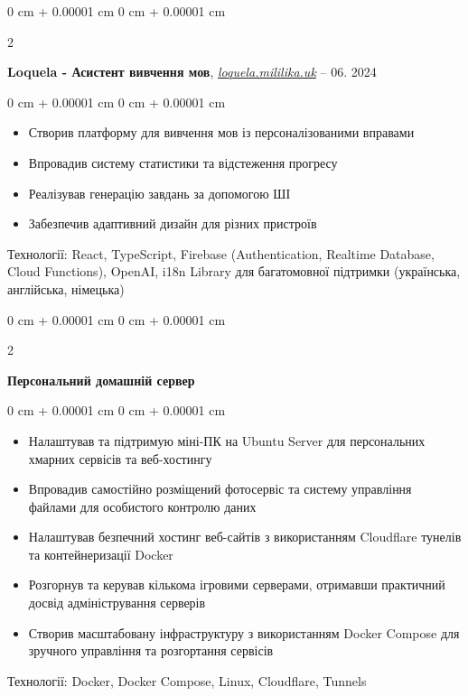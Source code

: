 \documentclass[10pt, letterpaper]{article}
\newenvironment{highlights}{
    \begin{itemize}[
        topsep=0.10 cm,
        parsep=0.10 cm,
        partopsep=0pt,
        itemsep=0pt,
        leftmargin=0 cm + 10pt
    ]
}{
    \end{itemize}
} %
\newenvironment{onecolentry}{
    \begin{adjustwidth}{
        0 cm + 0.00001 cm
    }{
        0 cm + 0.00001 cm
    }
}{
    \end{adjustwidth}
} %
\newenvironment{twocolentry}[2][]{
    \onecolentry
    \def\secondColumn{#2}
    \setcolumnwidth{\fill, 4.5 cm}
    \begin{paracol}{2}
}{
    \switchcolumn \raggedleft \secondColumn
    \end{paracol}
    \endonecolentry
} %
\let\hrefWithoutArrow\href
\begin{document}
    \begin{twocolentry}{
        04.2024 – 06. 2024
    }
        \textbf{Loquela - Асистент вивчення мов}, \hrefWithoutArrow{https://loquela.mililika.uk}{\textit{loquela.mililika.uk}} \end{twocolentry}
    \vspace{0.20 cm}
    \begin{onecolentry}
        \begin{highlights}
            \item Створив платформу для вивчення мов із персоналізованими вправами
            \item Впровадив систему статистики та відстеження прогресу
            \item Реалізував генерацію завдань за допомогою ШІ
            \item Забезпечив адаптивний дизайн для різних пристроїв
        \end{highlights}
    \end{onecolentry}
    \vspace{0.2 cm}
    Технології: React, TypeScript, Firebase (Authentication, Realtime Database, Cloud Functions), OpenAI, i18n Library для багатомовної підтримки (українська, англійська, німецька)

    \vspace{0.7 cm}

    \begin{twocolentry}{}
        \textbf{Персональний домашній сервер} \end{twocolentry}
    \vspace{0.20 cm}
    \begin{onecolentry}
        \begin{highlights}
            \item Налаштував та підтримую міні-ПК на Ubuntu Server для персональних хмарних сервісів та веб-хостингу
            \item Впровадив самостійно розміщений фотосервіс та систему управління файлами для особистого контролю даних
            \item Налаштував безпечний хостинг веб-сайтів з використанням Cloudflare тунелів та контейнеризації Docker
            \item Розгорнув та керував кількома ігровими серверами, отримавши практичний досвід адміністрування серверів
            \item Створив масштабовану інфраструктуру з використанням Docker Compose для зручного управління та розгортання сервісів
        \end{highlights}
    \end{onecolentry}
    \vspace{0.2 cm}
    Технології: Docker, Docker Compose, Linux, Cloudflare, Tunnels
    
\end{document}
